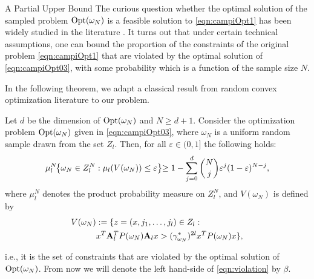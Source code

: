\begin{subsection}{A Partial Upper Bound}
The curious question whether the optimal solution of the sampled problem $\text{Opt}(\omega_N)$ is a feasible solution to \eqref{eqn:campiOpt1} has been widely studied in the literature \cite{campi}. It turns out that under certain technical assumptions, one can bound the proportion of the constraints of the original problem \eqref{eqn:campiOpt1} that are violated by the optimal solution of \eqref{eqn:campiOpt03}, with some probability which is a function of the sample size $N$. 

In the following theorem, we adapt a classical result from random convex optimization literature to our problem.
\begin{thm}\label{mainTheorem0}
Let $d$ be the dimension of $\text{Opt}(\omega_N)$ and $N \geq d+1$. Consider the optimization problem $\text{Opt}(\omega_N)$ given in \eqref{eqn:campiOpt03}, where $\omega_N$ is a uniform random sample drawn from the set $Z_l$.
Then, for all $\varepsilon \in (0,1]$ the following holds:
\begin{equation}\label{eqn:violation}
\mu_l^N\hspace{-1mm}\left\{ \omega_N \in Z_l^N: \mu_l(V(\omega_N)) \leq \varepsilon \right\}\hspace{-1mm} \geq 1- \sum_{j=0}^{d} \binom{N}{j}\varepsilon^j (1-\varepsilon)^{N-j},
\end{equation}
where $\mu_l^N$ denotes the product probability measure on $Z_l^N$, and $V(\omega_N)$ is defined by 
\begin{equation*} 
\begin{aligned}
 V(\omega_N) &:= \{z=(x,j_{1},\dots,j_{l}) \in Z_l: \\
&x^T \mathbf{A}_l^T P(\omega_N)\mathbf{A}_l x> (\gamma_{\omega_N}^{*})^{2l} x^T P(\omega_N) x\},
\end{aligned}
\end{equation*}

i.e., it is the set of constraints that are violated by the optimal solution of $\text{Opt}(\omega_N)$. From now we will denote the left hand-side of \eqref{eqn:violation} by $\beta$.
\end{thm}




\end{subsection}
